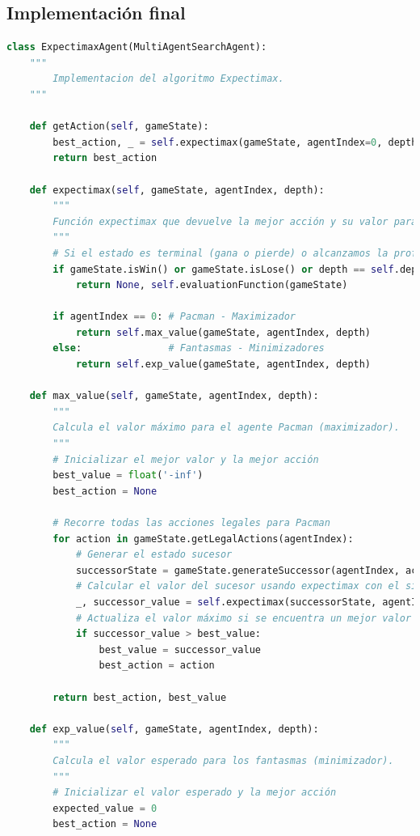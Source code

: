 \documentclass{report}
\begin{document}
        \subsection*{Implementación final}
            \begin{lstlisting}[language=Python, caption=Implementación final del agente Expectimax]
class ExpectimaxAgent(MultiAgentSearchAgent):
    """
        Implementacion del algoritmo Expectimax.
    """

    def getAction(self, gameState):
        best_action, _ = self.expectimax(gameState, agentIndex=0, depth=0)
        return best_action
    
    def expectimax(self, gameState, agentIndex, depth):
        """
        Función expectimax que devuelve la mejor acción y su valor para el agente actual.
        """
        # Si el estado es terminal (gana o pierde) o alcanzamos la profundidad máxima, evaluamos el estado
        if gameState.isWin() or gameState.isLose() or depth == self.depth:
            return None, self.evaluationFunction(gameState)

        if agentIndex == 0: # Pacman - Maximizador
            return self.max_value(gameState, agentIndex, depth)
        else:               # Fantasmas - Minimizadores
            return self.exp_value(gameState, agentIndex, depth)
        
    def max_value(self, gameState, agentIndex, depth):
        """
        Calcula el valor máximo para el agente Pacman (maximizador).
        """
        # Inicializar el mejor valor y la mejor acción
        best_value = float('-inf')
        best_action = None

        # Recorre todas las acciones legales para Pacman
        for action in gameState.getLegalActions(agentIndex):
            # Generar el estado sucesor
            successorState = gameState.generateSuccessor(agentIndex, action)
            # Calcular el valor del sucesor usando expectimax con el siguiente agente
            _, successor_value = self.expectimax(successorState, agentIndex + 1, depth)
            # Actualiza el valor máximo si se encuentra un mejor valor
            if successor_value > best_value:
                best_value = successor_value
                best_action = action

        return best_action, best_value
    
    def exp_value(self, gameState, agentIndex, depth):
        """
        Calcula el valor esperado para los fantasmas (minimizador).
        """
        # Inicializar el valor esperado y la mejor acción
        expected_value = 0
        best_action = None


\end{lstlisting}
\end{document}
